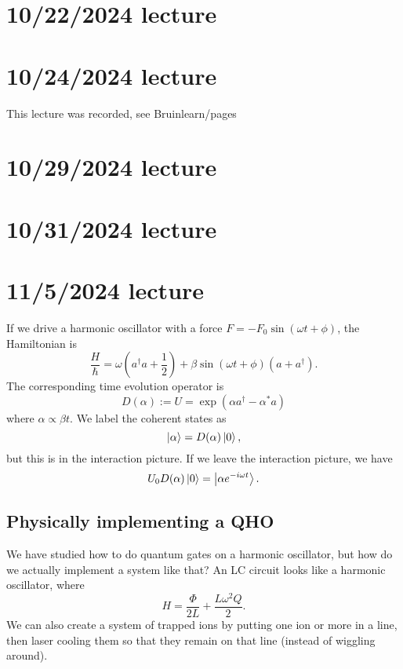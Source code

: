 \documentclass{article}
\begin{document}
\section{10/22/2024 lecture}

\section{10/24/2024 lecture}
This lecture was recorded, see Bruinlearn/pages

\section{10/29/2024 lecture}

\section{10/31/2024 lecture}

\section{11/5/2024 lecture}
If we drive a harmonic oscillator with a force $F=-F_0\sin(\omega t + \phi)$, the Hamiltonian is
\[ \frac{H}{\hbar} = \omega (a^\dag a + \frac{1}{2}) + \beta \sin (\omega t + \phi) (a + a^\dag). \]
The corresponding time evolution operator is
\[ D(\alpha) := U = \exp \left( \alpha a^\dag - \alpha^* a \right) \]
where $\alpha \propto \beta t$. We label the coherent states as
\[ \left\lvert \alpha \right\rangle = D(\alpha) \left\lvert 0 \right\rangle, \]
but this is in the interaction picture. If we leave the interaction picture, we have
\[ U_0 D(\alpha) \left\lvert 0 \right\rangle = \left\lvert \alpha e^{-i \omega t} \right\rangle. \]

\subsection{Physically implementing a QHO}
We have studied how to do quantum gates on a harmonic oscillator, but how do we actually implement a system like that? An LC circuit looks like a harmonic oscillator, where
\[ H = \frac{\Phi}{2L} + \frac{L \omega^2 Q}{2}. \]
We can also create a system of trapped ions by putting one ion or more in a line, then laser cooling them so that they remain on that line (instead of wiggling around).
\end{document}
